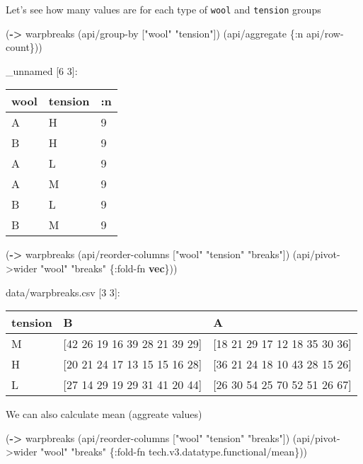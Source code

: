 \documentclass[]{article}
\newenvironment{Shaded}{\begin{snugshade}}{\end{snugshade}}
\newcommand{\AttributeTok}[1]{\textcolor[rgb]{0.77,0.63,0.00}{#1}}
\newcommand{\KeywordTok}[1]{\textcolor[rgb]{0.13,0.29,0.53}{\textbf{#1}}}
\newcommand{\NormalTok}[1]{#1}
\newcommand{\StringTok}[1]{\textcolor[rgb]{0.31,0.60,0.02}{#1}}
\begin{document}
Let's see how many values are for each type of \texttt{wool} and
\texttt{tension} groups

\begin{Shaded}
\begin{Highlighting}[]
\NormalTok{(}\KeywordTok{->}\NormalTok{ warpbreaks}
\NormalTok{    (api/group-by [}\StringTok{"wool"} \StringTok{"tension"}\NormalTok{])}
\NormalTok{    (api/aggregate \{}\AttributeTok{:n}\NormalTok{ api/row-count\}))}
\end{Highlighting}
\end{Shaded}

\_unnamed {[}6 3{]}:

\begin{longtable}[]{@{}lll@{}}
\toprule
wool & tension & :n\tabularnewline
\midrule
\endhead
A & H & 9\tabularnewline
B & H & 9\tabularnewline
A & L & 9\tabularnewline
A & M & 9\tabularnewline
B & L & 9\tabularnewline
B & M & 9\tabularnewline
\bottomrule
\end{longtable}

\begin{Shaded}
\begin{Highlighting}[]
\NormalTok{(}\KeywordTok{->}\NormalTok{ warpbreaks}
\NormalTok{    (api/reorder-columns [}\StringTok{"wool"} \StringTok{"tension"} \StringTok{"breaks"}\NormalTok{])}
\NormalTok{    (api/pivot->wider }\StringTok{"wool"} \StringTok{"breaks"}\NormalTok{ \{}\AttributeTok{:fold-fn} \KeywordTok{vec}\NormalTok{\}))}
\end{Highlighting}
\end{Shaded}

data/warpbreaks.csv {[}3 3{]}:

\begin{longtable}[]{@{}lll@{}}
\toprule
tension & B & A\tabularnewline
\midrule
\endhead
M & {[}42 26 19 16 39 28 21 39 29{]} & {[}18 21 29 17 12 18 35 30
36{]}\tabularnewline
H & {[}20 21 24 17 13 15 15 16 28{]} & {[}36 21 24 18 10 43 28 15
26{]}\tabularnewline
L & {[}27 14 29 19 29 31 41 20 44{]} & {[}26 30 54 25 70 52 51 26
67{]}\tabularnewline
\bottomrule
\end{longtable}

We can also calculate mean (aggreate values)

\begin{Shaded}
\begin{Highlighting}[]
\NormalTok{(}\KeywordTok{->}\NormalTok{ warpbreaks}
\NormalTok{    (api/reorder-columns [}\StringTok{"wool"} \StringTok{"tension"} \StringTok{"breaks"}\NormalTok{])}
\NormalTok{    (api/pivot->wider }\StringTok{"wool"} \StringTok{"breaks"}\NormalTok{ \{}\AttributeTok{:fold-fn}\NormalTok{ tech.v3.datatype.functional/mean\}))}
\end{Highlighting}
\end{Shaded}
\end{document}
